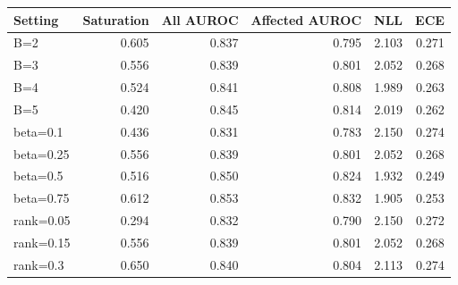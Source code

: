 \begin{tabular}{lrrrrr}
\toprule
Setting & Saturation & All AUROC & Affected AUROC & NLL & ECE \\
\midrule
B=2 & 0.605 & 0.837 & 0.795 & 2.103 & 0.271 \\
B=3 & 0.556 & 0.839 & 0.801 & 2.052 & 0.268 \\
B=4 & 0.524 & 0.841 & 0.808 & 1.989 & 0.263 \\
B=5 & 0.420 & 0.845 & 0.814 & 2.019 & 0.262 \\
beta=0.1 & 0.436 & 0.831 & 0.783 & 2.150 & 0.274 \\
beta=0.25 & 0.556 & 0.839 & 0.801 & 2.052 & 0.268 \\
beta=0.5 & 0.516 & 0.850 & 0.824 & 1.932 & 0.249 \\
beta=0.75 & 0.612 & 0.853 & 0.832 & 1.905 & 0.253 \\
rank=0.05 & 0.294 & 0.832 & 0.790 & 2.150 & 0.272 \\
rank=0.15 & 0.556 & 0.839 & 0.801 & 2.052 & 0.268 \\
rank=0.3 & 0.650 & 0.840 & 0.804 & 2.113 & 0.274 \\
\bottomrule
\end{tabular}